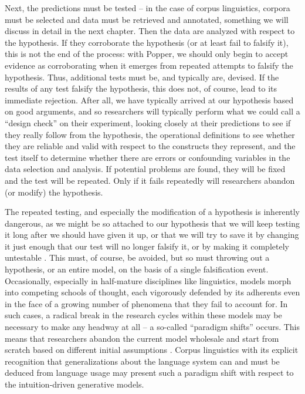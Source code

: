 Next, the predictions must be tested -- in the case of corpus linguistics, corpora must be selected and data must be retrieved  and annotated,  something we will discuss in detail in the next chapter. Then the data are analyzed with respect to the hypothesis.  If they corroborate  the hypothesis (or at least fail to falsify  it), this is not the end of the process: with Popper, we should only begin to accept evidence as corroborating when it emerges from repeated attempts to falsify the hypothesis. Thus, additional tests must be, and typically are, devised. If the results of any test falsify  the hypothesis, this does not, of course, lead to its immediate rejection. After all, we have typically arrived at our hypothesis based on good arguments, and so researchers will typically perform what we could call a ``design  check'' on their experiment,  looking closely at their predictions to see if they really follow from the hypothesis,  the operational  definitions to see whether they are reliable  and valid  with respect to the constructs they represent, and the test itself to determine whether there are errors or confounding variables in the data selection and analysis. If potential problems are found, they will be fixed and the test will be repeated. Only if it fails repeatedly will researchers abandon (or modify) the hypothesis.

The repeated testing, and especially the modification of a hypothesis  is inherently dangerous, as we might be so attached to our hypothesis that we will keep testing it long after we should have given it up, or that we will try to save it by changing it just enough that our test will no longer falsify  it, or by making it completely untestable \citep[cf.][37]{popper_conjectures_1963}. This must, of course, be avoided, but so must throwing out a hypothesis,  or an entire model, on the basis of a single falsification  event. Occasionally, especially in half\hyp{}mature disciplines like linguistics, models morph into competing schools of thought, each vigorously defended by its adherents even in the face of a growing number of phenomena that they fail to account for. In such cases, a radical break in the research cycles within these models may be necessary to make any headway at all -- a so\hyp{}called ``paradigm shifts'' occurs. This means that researchers abandon the current model wholesale and start from scratch based on different initial assumptions \citep[see][]{kuhn_structure_1962}. Corpus linguistics with its explicit recognition that generalizations about the language system can and must be deduced from language usage may present such a paradigm shift with respect to the intuition\hyp{}driven  generative  models.

